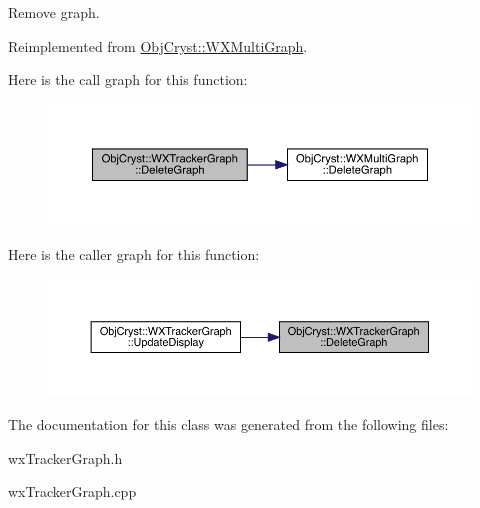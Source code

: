 Remove graph. 

Reimplemented from \mbox{\hyperlink{class_obj_cryst_1_1_w_x_multi_graph_aeeea3497b22a397a5a521322698c3166}{Obj\+Cryst\+::\+W\+X\+Multi\+Graph}}.

Here is the call graph for this function\+:
\nopagebreak
\begin{figure}[H]
\begin{center}
\leavevmode
\includegraphics[width=350pt]{class_obj_cryst_1_1_w_x_tracker_graph_af36c19c220ac18f46ff11954ed695686_cgraph}
\end{center}
\end{figure}
Here is the caller graph for this function\+:
\nopagebreak
\begin{figure}[H]
\begin{center}
\leavevmode
\includegraphics[width=350pt]{class_obj_cryst_1_1_w_x_tracker_graph_af36c19c220ac18f46ff11954ed695686_icgraph}
\end{center}
\end{figure}


The documentation for this class was generated from the following files\+:\begin{DoxyCompactItemize}
\item 
wx\+Tracker\+Graph.\+h\item 
wx\+Tracker\+Graph.\+cpp\end{DoxyCompactItemize}
